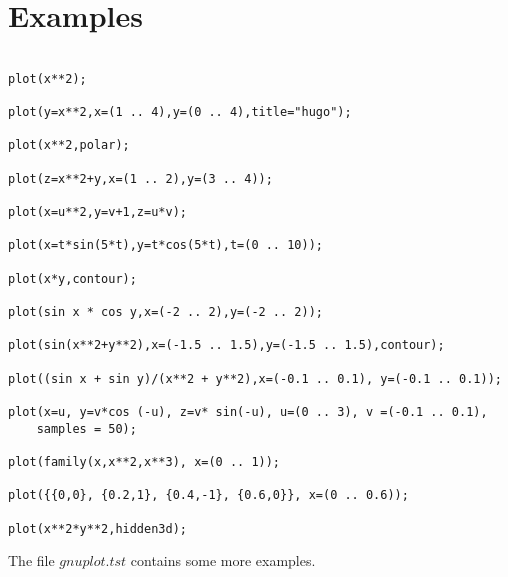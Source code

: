 \section{Examples}
 
\begin{verbatim}

plot(x**2);

plot(y=x**2,x=(1 .. 4),y=(0 .. 4),title="hugo");

plot(x**2,polar);

plot(z=x**2+y,x=(1 .. 2),y=(3 .. 4));

plot(x=u**2,y=v+1,z=u*v);

plot(x=t*sin(5*t),y=t*cos(5*t),t=(0 .. 10));

plot(x*y,contour);

plot(sin x * cos y,x=(-2 .. 2),y=(-2 .. 2));

plot(sin(x**2+y**2),x=(-1.5 .. 1.5),y=(-1.5 .. 1.5),contour);

plot((sin x + sin y)/(x**2 + y**2),x=(-0.1 .. 0.1), y=(-0.1 .. 0.1));

plot(x=u, y=v*cos (-u), z=v* sin(-u), u=(0 .. 3), v =(-0.1 .. 0.1),
    samples = 50);

plot(family(x,x**2,x**3), x=(0 .. 1));

plot({{0,0}, {0.2,1}, {0.4,-1}, {0.6,0}}, x=(0 .. 0.6));

plot(x**2*y**2,hidden3d);

\end{verbatim}

The file $gnuplot.tst$ contains some more examples.
 



